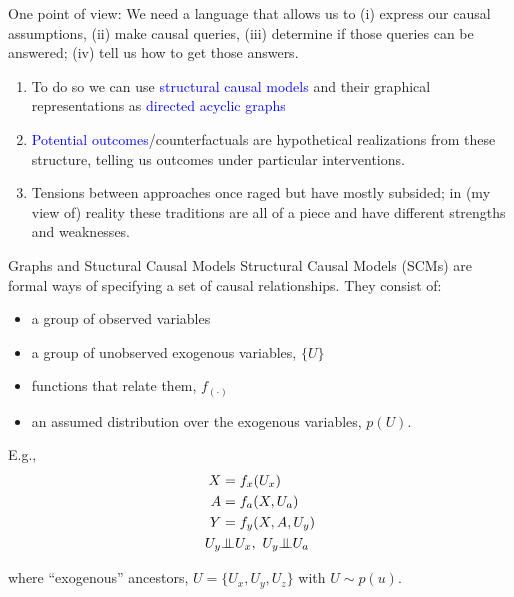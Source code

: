 \documentclass[xcolor=dvipsnames]{beamer}
\newcommand{\indep}{{\bot\negthickspace\negthickspace\bot}}
\begin{document}
\begin{frame}{One point of view:}
\small
{} We need a language that allows us to (i) express our causal assumptions, (ii) make causal queries, (iii) determine if those queries can be answered; (iv) tell us how to get those answers.  \\
\medskip
\begin{enumerate} \setlength\itemsep{1em}
\item<2-> To do so we can use \textcolor{Blue}{structural causal models} and their graphical  representations as \textcolor{Blue}{directed acyclic graphs}  
\item<3-> \textcolor{Blue}{Potential outcomes}/counterfactuals are hypothetical realizations from these structure, telling us outcomes under particular interventions.
\item<4-> Tensions between approaches once raged but have mostly subsided; in (my view of) reality these traditions are all of a piece and have different strengths and weaknesses.
\end{enumerate}
\end{frame}

\begin{frame}{Graphs and Stuctural Causal Models}
 Structural Causal Models (SCMs) are formal ways of specifying a set of causal relationships.   They consist of:
\footnotesize
\begin{itemize}
\item a group of observed variables 
\item a group of unobserved exogenous variables, $\{U\}$
\item functions that relate them, $f_{(\cdot)}$
\item  an assumed distribution over the exogenous variables, $p(U)$.
\end{itemize}
  E.g.,
            \begin{align*}
                X &= f_{x}(U_x)\\
                A &= f_{a}(X, U_a)\\
                Y &= f_{y}(X, A, U_y)\\
                U_{y}&\indep U_{x},~ U_{y}\indep U_{a}
            \end{align*}
          
where ``exogenous'' ancestors,  $U = \{U_{x}, U_{y}, U_{z}\}$ with $U\sim p(u)$.  
\end{frame}
\end{document}
